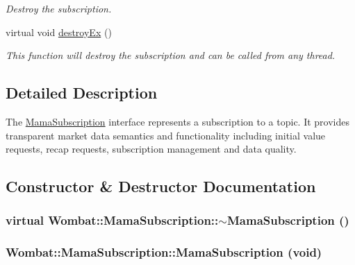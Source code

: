 \begin{DoxyCompactItemize}
\begin{DoxyCompactList}\small\item\em Destroy the subscription. \item\end{DoxyCompactList}\item 
virtual void \hyperlink{classWombat_1_1MamaSubscription_a2607ec39a0426074664326920a5733f9}{destroyEx} ()
\begin{DoxyCompactList}\small\item\em This function will destroy the subscription and can be called from any thread. \item\end{DoxyCompactList}\end{DoxyCompactItemize}


\subsection{Detailed Description}
The {\ttfamily \hyperlink{classWombat_1_1MamaSubscription}{MamaSubscription}} interface represents a subscription to a topic. It provides transparent market data semantics and functionality including initial value requests, recap requests, subscription management and data quality. 

\subsection{Constructor \& Destructor Documentation}
\hypertarget{classWombat_1_1MamaSubscription_ad5dcdc6ddc4cda8263946a226d2423f2}{
\subsubsection[{$\sim$MamaSubscription}]{\setlength{\rightskip}{0pt plus 5cm}virtual Wombat::MamaSubscription::$\sim$MamaSubscription ()}}
\label{classWombat_1_1MamaSubscription_ad5dcdc6ddc4cda8263946a226d2423f2}
\hypertarget{classWombat_1_1MamaSubscription_a65c320b11e7b12295d7c1c80029c61c2}{
\subsubsection[{MamaSubscription}]{\setlength{\rightskip}{0pt plus 5cm}Wombat::MamaSubscription::MamaSubscription (void)}}
\label{classWombat_1_1MamaSubscription_a65c320b11e7b12295d7c1c80029c61c2}


